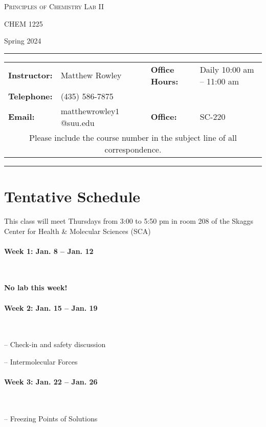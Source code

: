 \documentclass[12pt, letterpaper]{article}
\begin{document}
\begin{center}
{\Large \textsc{Principles of Chemistry Lab II}}

CHEM 1225
\end{center}

\begin{center}
	{\large Spring 2024}
\end{center}
\begin{center}
	\rule{0.99\textwidth}{0.4pt}
	\begin{tabular}{llcll}
		\textbf{Instructor:} & Matthew Rowley           &  & \textbf{Office Hours:} & Daily 10:00 am -- 11:00 am \\
		\textbf{Telephone:}  & (435) 586-7875           &  &                        &                            \\
		\textbf{Email:}      & matthewrowley$1$@suu.edu &  & \textbf{Office:}       & SC-220                     \\
		\multicolumn{5}{c}{Please include the course number in the subject line of all correspondence.}
	\end{tabular}
	\rule{0.99\textwidth}{0.4pt}
\end{center}

\section*{Tentative Schedule}
This class will meet Thursdays from 3:00 to 5:50 pm in room 208 of the Skaggs Center for Health \& Molecular Sciences (SCA)

\paragraph{Week 1: Jan. 8 -- Jan. 12}~

\textbf{No lab this week!}

\paragraph{Week 2: Jan. 15 -- Jan. 19}~

-- Check-in and safety discussion

-- Intermolecular Forces

\paragraph{Week 3: Jan. 22 -- Jan. 26}~

-- Freezing Points of Solutions
\end{document}
